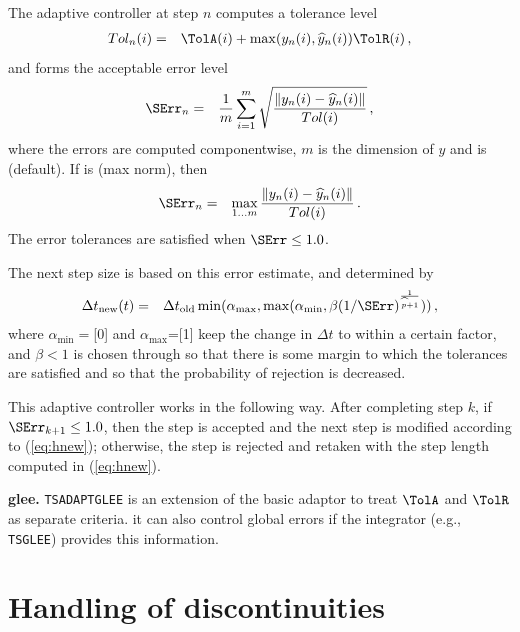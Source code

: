 The adaptive controller at step $n$ computes a tolerance level
\begin{eqnarray*}
Tol_n(i)&=&\TolA(i) +  \max(y_n(i),\widehat{y}_n(i)) \TolR(i)\,,
\end{eqnarray*}
and forms the acceptable error level 
\begin{eqnarray*}
\SErr_n&=& \frac{1}{m} \sum_{i=1}^{m}\sqrt{\frac{\left\|y_n(i)
  -\widehat{y}_n(i)\right\|}{Tol(i)}}\,,
\end{eqnarray*}
where the errors are computed componentwise, $m$ is the dimension of
$y$ and  is  (default).
If  is  (max norm), then 
\begin{eqnarray*}
\SErr_n&=& \max_{1\dots m}\frac{\left\|y_n(i)
  -\widehat{y}_n(i)\right\|}{Tol(i)}\,.
\end{eqnarray*}
The error tolerances are satisfied when $\SErr \le 1.0$. 

The next step size is based on this error estimate, and determined by
\begin{eqnarray}
  \label{eq:hnew}
 \Delta t_{\rm new}(t)&=&\Delta t_{\rm{old}} \min(\alpha_{\max},
 \max(\alpha_{\min}, \beta (1/\SErr)^\frac{1}{\widehat{p}+1}))\,,
\end{eqnarray}
where $\alpha_{\min}=$[0] and
$\alpha_{\max}$=[1] keep the change in
$\Delta t$
to within a certain factor, and $\beta<1$ is chosen
through  so that there is
some margin to which the tolerances are satisfied and so that the
probability of rejection is decreased.

This adaptive controller works in the following way. After completing
step $k$, if $\SErr_{k+1} \le 1.0$, then the step is accepted and the
next step is modified according to (\ref{eq:hnew}); otherwise, the step
is rejected and retaken with the step length computed in (\ref{eq:hnew}).

\noindent\textbf{ glee.} \lstinline{TSADAPTGLEE} is an extension of
the basic adaptor to treat $\TolA$ and $\TolR$ as separate criteria.
it can also control global errors if the integrator (e.g., \lstinline{TSGLEE})
provides this information.

\section{Handling of discontinuities}

